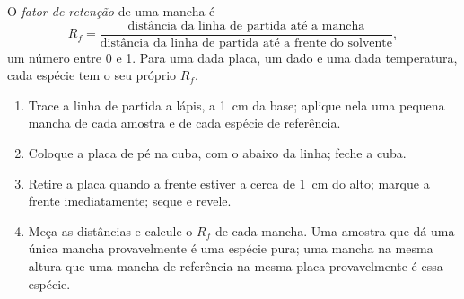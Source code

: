 \begin{definition}\label{def:g10:chemical-species:retention-factor}
O \emph{fator de retenção} de uma mancha é
\[
  R_f = \frac{\text{distância da linha de partida até a mancha}}
             {\text{distância da linha de partida até a frente do solvente}},
\]
um número entre 0 e 1. Para uma dada placa, um dado  e uma dada
temperatura, cada espécie tem o seu próprio $R_f$.
\end{definition}

\begin{method}\label{met:g10:chemical-species:tlc}
\begin{enumerate}
  \item Trace a linha de partida a lápis, a \qty{1}{cm} da base;
        aplique nela uma pequena mancha de cada amostra e de cada espécie
        de referência.
  \item Coloque a placa de pé na cuba, com o  abaixo da linha;
        feche a cuba.
  \item Retire a placa quando a frente estiver a cerca de \qty{1}{cm} do
        alto; marque a frente imediatamente; seque e revele.
  \item Meça as distâncias e calcule o $R_f$ de cada mancha. Uma amostra
        que dá uma única mancha provavelmente é uma espécie pura; uma
        mancha na mesma altura que uma mancha de referência na mesma
        placa provavelmente é essa espécie.
\end{enumerate}
\end{method}

